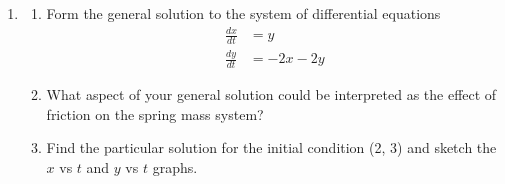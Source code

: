\begin{enumerate}
\clearpage

\item	\label{11problem7}
\begin{enumerate}
\item Form the general solution to the system of differential equations 
\begin{align*}
\frac{dx}{dt}&=y \\ \frac{dy}{dt}&= -2x-2y
\end{align*}
\item What aspect of your general solution could be interpreted as the effect of friction on the spring mass system?
\item Find the particular solution for the initial condition (2, 3) and sketch the $x$ vs $t$ and $y$ vs $t$ graphs. 
\end{enumerate}
\end{enumerate}

\clearpage


